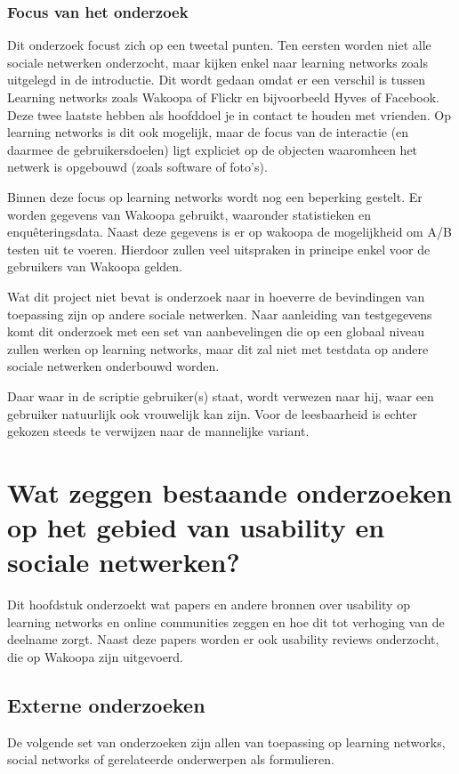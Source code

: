 \documentclass[a4paper, 10pt, pdftex]{report}
\begin{document}
  \subsection*{Focus van het onderzoek}
    Dit onderzoek focust zich op een tweetal punten. Ten eersten worden niet alle sociale netwerken onderzocht, maar kijken enkel naar learning networks zoals uitgelegd in de introductie. Dit wordt gedaan omdat er een verschil is tussen Learning networks zoals Wakoopa of Flickr en bijvoorbeeld Hyves of Facebook. Deze twee laatste hebben als hoofddoel je in contact te houden met vrienden. Op learning networks is dit ook mogelijk, maar de focus van de interactie (en daarmee de gebruikersdoelen) ligt expliciet op de objecten waaromheen het netwerk is opgebouwd (zoals software of foto's).

    Binnen deze focus op learning networks wordt nog een beperking gestelt. Er worden gegevens van Wakoopa gebruikt, waaronder statistieken en enqu\^eteringsdata. Naast deze gegevens is er op wakoopa de mogelijkheid om A/B testen uit te voeren. Hierdoor zullen veel uitspraken in principe enkel voor de gebruikers van Wakoopa gelden.

    Wat dit project niet bevat is onderzoek naar in hoeverre de bevindingen van toepassing zijn op andere sociale netwerken. Naar aanleiding van testgegevens komt dit onderzoek met een set van aanbevelingen die op een globaal niveau zullen werken op learning networks, maar dit zal niet met testdata op andere sociale netwerken onderbouwd worden.

    Daar waar in de scriptie gebruiker(s) staat, wordt verwezen naar hij, waar een gebruiker natuurlijk ook vrouwelijk kan zijn. Voor de leesbaarheid is echter gekozen steeds te verwijzen naar de mannelijke variant.

  \newpage
  \chapter{Wat zeggen bestaande onderzoeken op het gebied van usability en sociale netwerken?}
    \label{researchchapter}
    \newpage

    Dit hoofdstuk onderzoekt wat papers en andere bronnen over usability op learning networks en online communities zeggen en hoe dit tot verhoging van de deelname zorgt. Naast deze papers worden er ook usability reviews onderzocht, die op Wakoopa zijn uitgevoerd.

    \section{Externe onderzoeken}
      De volgende set van onderzoeken zijn allen van toepassing op learning networks, social networks of gerelateerde onderwerpen als formulieren.
\end{document}
